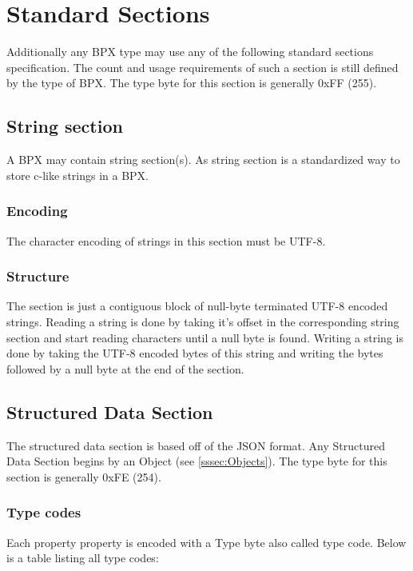\section{Standard Sections}

Additionally any BPX type may use any of the following standard sections specification. The count and usage requirements of such a section is still defined by the type of BPX. The type byte for this section is generally 0xFF (255).

\subsection{String section} \label{ssec:Strings}
A BPX may contain string section(s). As string section is a standardized way to store c-like strings in a BPX.

\subsubsection{Encoding}
The character encoding of strings in this section must be UTF-8.

\subsubsection{Structure}
The section is just a contiguous block of null-byte terminated UTF-8 encoded strings.\newline
Reading a string is done by taking it's offset in the corresponding string section and start reading characters until a null byte is found.\newline
Writing a string is done by taking the UTF-8 encoded bytes of this string and writing the bytes followed by a null byte at the end of the section.

\subsection{Structured Data Section} \label{ssec:Structured}
The structured data section is based off of the JSON format. Any Structured Data Section begins by an Object (see \ref{sssec:Objects}). The type byte for this section is generally 0xFE (254).

\subsubsection{Type codes}
Each property property is encoded with a Type byte also called type code.  Below is a table listing all type codes:

